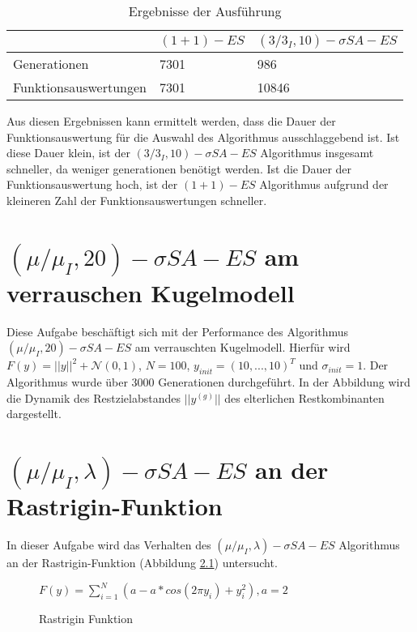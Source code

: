 \begin{table}[h]
  \begin{center}
  \begin{tabular}{|l|p{5cm}|p{5cm}|}
    \hline
     & $(1+1)-ES$ & $(3/3_I,10)-\sigma SA-ES$ \\
    \hline
    Generationen & 7301 & 986 \\
    \hline
    Funktionsauswertungen & 7301 & 10846 \\
    \hline
  \end{tabular}
  \caption{Ergebnisse der Ausführung}
  \end{center}
\end{table}

Aus diesen Ergebnissen kann ermittelt werden, dass die Dauer der Funktionsauswertung für die Auswahl des Algorithmus ausschlaggebend ist. Ist diese Dauer klein, ist der $(3/3_I,10)-\sigma SA-ES$ Algorithmus insgesamt schneller, da weniger generationen benötigt werden. Ist die Dauer der Funktionsauswertung hoch, ist der $(1+1)-ES$ Algorithmus aufgrund der kleineren Zahl der Funktionsauswertungen schneller.

\chapter{$(\mu/\mu_I,20)-\sigma SA-ES$ am verrauschen Kugelmodell}

Diese Aufgabe beschäftigt sich mit der Performance des Algorithmus $(\mu/\mu_I,20)-\sigma SA-ES$ am verrauschten Kugelmodell. Hierfür wird $F(y)=||y||^2+\mathcal{N}(0,1)$, $N=100$, $y_{init}=(10,...,10)^T$ und $\sigma_{init}=1$.
Der Algorithmus wurde über 3000 Generationen durchgeführt. In der Abbildung  wird die Dynamik des Restzielabstandes $||y^{(g)}||$ des elterlichen Restkombinanten dargestellt.



\chapter{$(\mu/\mu_I,\lambda)-\sigma SA-ES$ an der Rastrigin-Funktion}

In dieser Aufgabe wird das Verhalten des $(\mu/\mu_I,\lambda)-\sigma SA-ES$ Algorithmus an der Rastrigin-Funktion (Abbildung \ref{fig:rastrigin}) untersucht.

\begin{figure}[h]
  \label{fig:rastrigin}
  \begin{center}
  
    $F(y)=\sum_{i=1}^N(a-a*cos(2\pi y_i)+y_i^2), a=2$
    
  \end{center}
  \caption{Rastrigin Funktion}
  \label{fig:rastrigin}
\end{figure}


